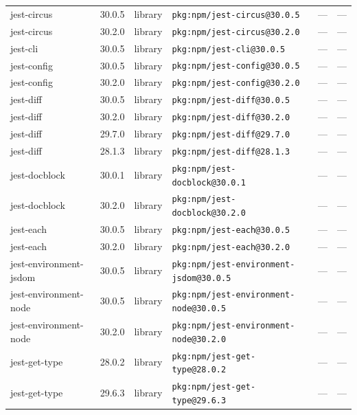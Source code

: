 \documentclass[11pt,a4paper]{article}
\begin{document}
\begin{longtable}{|p{4cm}|p{2cm}|p{1.6cm}|p{5cm}|p{1.5cm}|p{3.5cm}|}
\raggedright jest-circus & 30.0.5 & library & \small\texttt{pkg:npm/jest-circus@30.0.5} & — & \small — \\
\raggedright jest-circus & 30.2.0 & library & \small\texttt{pkg:npm/jest-circus@30.2.0} & — & \small — \\
\raggedright jest-cli & 30.0.5 & library & \small\texttt{pkg:npm/jest-cli@30.0.5} & — & \small — \\
\raggedright jest-config & 30.0.5 & library & \small\texttt{pkg:npm/jest-config@30.0.5} & — & \small — \\
\raggedright jest-config & 30.2.0 & library & \small\texttt{pkg:npm/jest-config@30.2.0} & — & \small — \\
\raggedright jest-diff & 30.0.5 & library & \small\texttt{pkg:npm/jest-diff@30.0.5} & — & \small — \\
\raggedright jest-diff & 30.2.0 & library & \small\texttt{pkg:npm/jest-diff@30.2.0} & — & \small — \\
\raggedright jest-diff & 29.7.0 & library & \small\texttt{pkg:npm/jest-diff@29.7.0} & — & \small — \\
\raggedright jest-diff & 28.1.3 & library & \small\texttt{pkg:npm/jest-diff@28.1.3} & — & \small — \\
\raggedright jest-docblock & 30.0.1 & library & \small\texttt{pkg:npm/jest-docblock@30.0.1} & — & \small — \\
\raggedright jest-docblock & 30.2.0 & library & \small\texttt{pkg:npm/jest-docblock@30.2.0} & — & \small — \\
\raggedright jest-each & 30.0.5 & library & \small\texttt{pkg:npm/jest-each@30.0.5} & — & \small — \\
\raggedright jest-each & 30.2.0 & library & \small\texttt{pkg:npm/jest-each@30.2.0} & — & \small — \\
\raggedright jest-environment-jsdom & 30.0.5 & library & \small\texttt{pkg:npm/jest-environment-jsdom@30.0.5} & — & \small — \\
\raggedright jest-environment-node & 30.0.5 & library & \small\texttt{pkg:npm/jest-environment-node@30.0.5} & — & \small — \\
\raggedright jest-environment-node & 30.2.0 & library & \small\texttt{pkg:npm/jest-environment-node@30.2.0} & — & \small — \\
\raggedright jest-get-type & 28.0.2 & library & \small\texttt{pkg:npm/jest-get-type@28.0.2} & — & \small — \\
\raggedright jest-get-type & 29.6.3 & library & \small\texttt{pkg:npm/jest-get-type@29.6.3} & — & \small — \\

\end{longtable}
\end{document}
